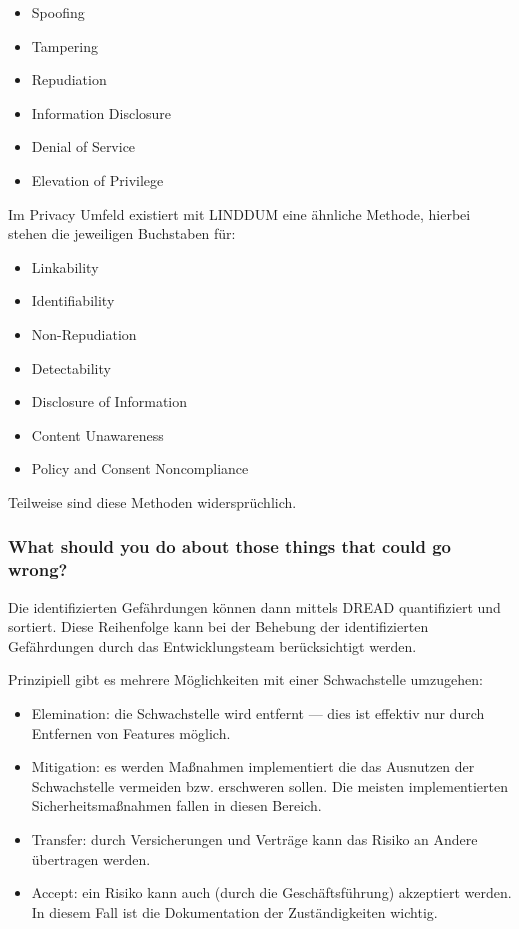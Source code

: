 \begin{itemize}
	\item Spoofing
	\item Tampering
	\item Repudiation
	\item Information Disclosure
	\item Denial of Service
	\item Elevation of Privilege
\end{itemize}

Im Privacy Umfeld existiert mit LINDDUM eine ähnliche Methode, hierbei stehen die jeweiligen Buchstaben für:

\begin{itemize}
	\item Linkability
	\item Identifiability
	\item Non-Repudiation
	\item Detectability
	\item Disclosure of Information
	\item Content Unawareness
	\item Policy and Consent Noncompliance
\end{itemize}

Teilweise sind diese Methoden widersprüchlich.

\subsubsection{What should you do about those things that could go wrong?}

Die identifizierten Gefährdungen können dann mittels DREAD quantifiziert und sortiert. Diese Reihenfolge kann bei der Behebung der identifizierten Gefährdungen durch das Entwicklungsteam berücksichtigt werden.

Prinzipiell gibt es mehrere Möglichkeiten mit einer Schwachstelle umzugehen:

\begin{itemize}
	\item Elemination: die Schwachstelle wird entfernt --- dies ist effektiv nur durch Entfernen von Features möglich.
	\item Mitigation: es werden Maßnahmen implementiert die das Ausnutzen der Schwachstelle vermeiden bzw. erschweren sollen. Die meisten implementierten Sicherheitsmaßnahmen fallen in diesen Bereich.
	\item Transfer: durch Versicherungen und Verträge kann das Risiko an Andere übertragen werden.
	\item Accept: ein Risiko kann auch (durch die Geschäftsführung) akzeptiert werden. In diesem Fall ist die Dokumentation der Zuständigkeiten wichtig.
\end{itemize}

